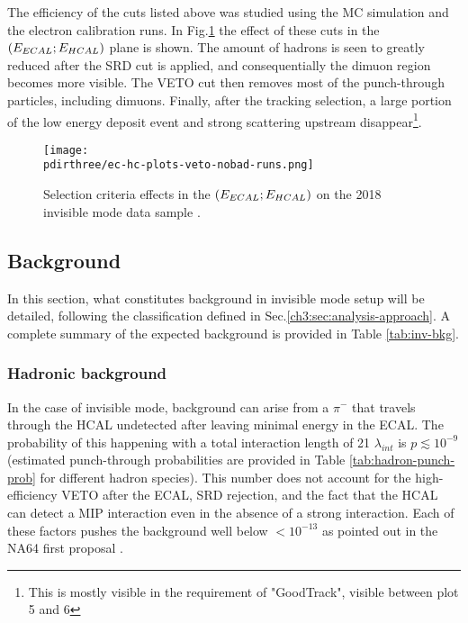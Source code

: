 The efficiency of the cuts listed above was studied using the MC simulation and the electron calibration runs.
In Fig.\ref{fig:inv-cut-ehcal} the effect of these cuts in the $(E_{ECAL};E_{HCAL})$ plane is shown.
The amount of hadrons is seen to greatly reduced after the SRD cut is applied, and consequentially the dimuon region becomes more visible. The VETO cut then removes most of the punch-through particles, including dimuons. Finally, after the tracking selection, a large portion of the low energy deposit event and strong scattering upstream disappear\footnote{This is mostly visible in the requirement of "GoodTrack", visible between plot 5 and 6}.


\begin{figure}[bth!]
  \centering
   \texttt{[image: \\pdirthree/ec-hc-plots-veto-nobad-runs.png]}
  \caption[Effect of the cuts in invisible mode]{Selection criteria effects in the $(E_{ECAL};E_{HCAL})$ on the 2018 invisible mode data sample \cite{invis-cut-plot,NA64:2019imj}.}
  \label{fig:inv-cut-ehcal}
\end{figure}

\subsection{Background}
\label{ch3:sec:bkg:inv}

In this section, what constitutes background in invisible mode setup will be detailed, following the classification defined in Sec.\ref{ch3:sec:analysis-approach}. A complete summary of the expected background is provided in Table \ref{tab:inv-bkg}.
\subsubsection{Hadronic background}
\label{ch3:sec:bkg:inv:hadr}


In the case of invisible mode, background can arise from a $\pi^-$ that travels through the HCAL undetected after leaving minimal energy in the ECAL. The probability of this happening with a total interaction length of 21 $\lambda_{int}$ is $p\lesssim 10^{-9}$ (estimated punch-through probabilities are provided in Table \ref{tab:hadron-punch-prob} for different hadron species). This number does not account for the high-efficiency VETO after the ECAL, SRD rejection, and the fact that the HCAL can detect a MIP interaction even in the absence of a strong interaction. Each of these factors pushes the background well below $<10^{-13}$ as pointed out in the NA64 first proposal \cite{Andreas:2013lya}.

